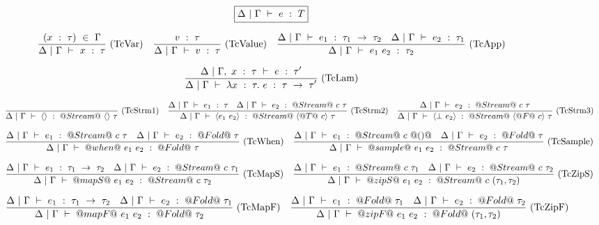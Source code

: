 \begin{figure*}

$$
\boxed{\Delta~|~\Gamma ~\vdash~ e~:~T}
$$


$$
\enskip \frac {\displaystyle 
    (x~:~\tau)~\in~\Gamma
} {\displaystyle  
    \Delta~|~\Gamma ~\vdash~ x~:~\tau
} \  \mbox{(TcVar)} \enskip
\enskip \frac {\displaystyle 
    v~:~\tau
} {\displaystyle  
    \Delta~|~\Gamma ~\vdash~ v~:~\tau
} \  \mbox{(TcValue)} \enskip
\enskip \frac {\displaystyle 
    \Delta~|~\Gamma ~\vdash~ e_1~:~\tau_1~\to~\tau_2
    \quad
    \Delta~|~\Gamma ~\vdash~ e_2~:~\tau_1
} {\displaystyle  
    \Delta~|~\Gamma ~\vdash~ e_1~e_2~:~\tau_2
} \  \mbox{(TcApp)} \enskip
$$

$$
\enskip \frac {\displaystyle 
    \Delta~|~\Gamma,~x~:~\tau ~\vdash~ e~:~\tau'
} {\displaystyle 
    \Delta~|~\Gamma ~\vdash~ \lambda{}x~:~\tau.~e~:~\tau~\to~\tau'
} \  \mbox{(TcLam)} \enskip
$$

$$
\enskip \frac {\displaystyle } {\displaystyle 
    \Delta~|~\Gamma ~\vdash~ \langle \rangle~:~@Stream@~\langle\rangle~\tau
} \  \mbox{(TcStrm1)} \enskip
\enskip \frac {\displaystyle 
    \Delta~|~\Gamma ~\vdash~ e_1~:~\tau
    \quad
    \Delta~|~\Gamma ~\vdash~ e_2~:~@Stream@~c~\tau
} {\displaystyle 
    \Delta~|~\Gamma ~\vdash~ \langle e_1~e_2 \rangle~:~@Stream@~\langle @T@~c \rangle~\tau
} \  \mbox{(TcStrm2)} \enskip
\enskip \frac {\displaystyle 
    \Delta~|~\Gamma ~\vdash~ e_2~:~@Stream@~c~\tau
} {\displaystyle 
    \Delta~|~\Gamma ~\vdash~ \langle \bot~e_2 \rangle~:~@Stream@~\langle @F@~c \rangle~\tau
} \  \mbox{(TcStrm3)} \enskip
$$

$$
\enskip \frac {\displaystyle 
    \Delta~|~\Gamma ~\vdash~ e_1~:~@Stream@~c~\tau
    \quad
    \Delta~|~\Gamma ~\vdash~ e_2~:~@Fold@~\tau
} {\displaystyle 
    \Delta~|~\Gamma ~\vdash~ @when@~e_1~e_2~:~@Fold@~\tau
} \  \mbox{(TcWhen)} \enskip
\enskip \frac {\displaystyle 
    \Delta~|~\Gamma ~\vdash~ e_1~:~@Stream@~c~@()@
    \quad
    \Delta~|~\Gamma ~\vdash~ e_2~:~@Fold@~\tau
} {\displaystyle 
    \Delta~|~\Gamma ~\vdash~ @sample@~e_1~e_2~:~@Stream@~c~\tau
} \  \mbox{(TcSample)} \enskip
$$

$$
\enskip \frac {\displaystyle 
    \Delta~|~\Gamma ~\vdash~ e_1~:~\tau_1~\to~\tau_2
    \quad
    \Delta~|~\Gamma ~\vdash~ e_2~:~@Stream@~c~\tau_1
} {\displaystyle 
    \Delta~|~\Gamma ~\vdash~ @mapS@~e_1~e_2~:~@Stream@~c~\tau_2
} \  \mbox{(TcMapS)} \enskip
\enskip \frac {\displaystyle 
    \Delta~|~\Gamma ~\vdash~ e_1~:~@Stream@~c~\tau_1
    \quad
    \Delta~|~\Gamma ~\vdash~ e_2~:~@Stream@~c~\tau_2
} {\displaystyle 
    \Delta~|~\Gamma ~\vdash~ @zipS@~e_1~e_2~:~@Stream@~c~(\tau_1,\tau_2)
} \  \mbox{(TcZipS)} \enskip
$$

$$
\enskip \frac {\displaystyle 
    \Delta~|~\Gamma ~\vdash~ e_1~:~\tau_1~\to~\tau_2
    \quad
    \Delta~|~\Gamma ~\vdash~ e_2~:~@Fold@~\tau_1
} {\displaystyle 
    \Delta~|~\Gamma ~\vdash~ @mapF@~e_1~e_2~:~@Fold@~\tau_2
} \  \mbox{(TcMapF)} \enskip
\enskip \frac {\displaystyle 
    \Delta~|~\Gamma ~\vdash~ e_1~:~@Fold@~\tau_1
    \quad
    \Delta~|~\Gamma ~\vdash~ e_2~:~@Fold@~\tau_2
} {\displaystyle 
    \Delta~|~\Gamma ~\vdash~ @zipF@~e_1~e_2~:~@Fold@~(\tau_1,\tau_2)
} \  \mbox{(TcZipF)} \enskip
$$


\end{figure*}
